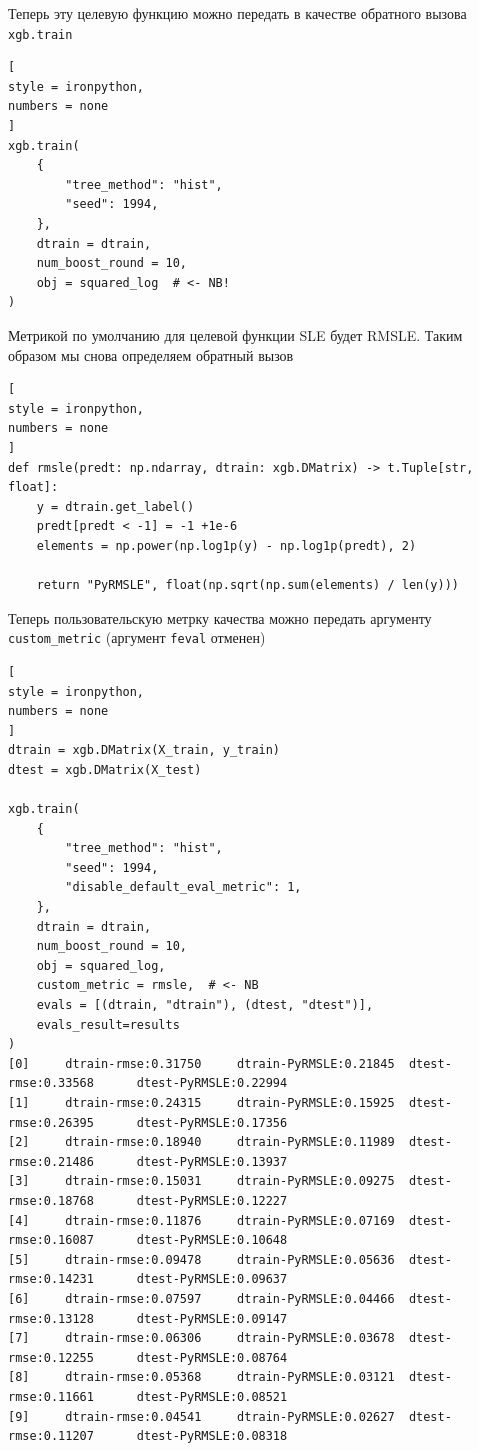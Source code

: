 \documentclass[%
	11pt,
	a4paper,
	utf8,
		]{article}
\begin{document}
Теперь эту целевую функцию можно передать в качестве обратного вызова \verb|xgb.train|
\begin{lstlisting}[
style = ironpython,
numbers = none
]
xgb.train(
    {
        "tree_method": "hist",
        "seed": 1994,
    },
    dtrain = dtrain,
    num_boost_round = 10,
    obj = squared_log  # <- NB!
)
\end{lstlisting}

Метрикой по умолчанию для целевой функции SLE будет RMSLE. Таким образом мы снова определяем обратный вызов
\begin{lstlisting}[
style = ironpython,
numbers = none
]
def rmsle(predt: np.ndarray, dtrain: xgb.DMatrix) -> t.Tuple[str, float]:
    y = dtrain.get_label()
    predt[predt < -1] = -1 +1e-6
    elements = np.power(np.log1p(y) - np.log1p(predt), 2)
    
    return "PyRMSLE", float(np.sqrt(np.sum(elements) / len(y)))
\end{lstlisting}

Теперь пользовательскую метрку качества можно передать аргументу \verb|custom_metric| (аргумент \verb|feval| отменен)
\begin{lstlisting}[
style = ironpython,
numbers = none
]
dtrain = xgb.DMatrix(X_train, y_train)
dtest = xgb.DMatrix(X_test)

xgb.train(
    {
        "tree_method": "hist",
        "seed": 1994,
        "disable_default_eval_metric": 1,
    },
    dtrain = dtrain,
    num_boost_round = 10,
    obj = squared_log,
    custom_metric = rmsle,  # <- NB
    evals = [(dtrain, "dtrain"), (dtest, "dtest")],
    evals_result=results
)
[0]     dtrain-rmse:0.31750     dtrain-PyRMSLE:0.21845  dtest-rmse:0.33568      dtest-PyRMSLE:0.22994
[1]     dtrain-rmse:0.24315     dtrain-PyRMSLE:0.15925  dtest-rmse:0.26395      dtest-PyRMSLE:0.17356
[2]     dtrain-rmse:0.18940     dtrain-PyRMSLE:0.11989  dtest-rmse:0.21486      dtest-PyRMSLE:0.13937
[3]     dtrain-rmse:0.15031     dtrain-PyRMSLE:0.09275  dtest-rmse:0.18768      dtest-PyRMSLE:0.12227
[4]     dtrain-rmse:0.11876     dtrain-PyRMSLE:0.07169  dtest-rmse:0.16087      dtest-PyRMSLE:0.10648
[5]     dtrain-rmse:0.09478     dtrain-PyRMSLE:0.05636  dtest-rmse:0.14231      dtest-PyRMSLE:0.09637
[6]     dtrain-rmse:0.07597     dtrain-PyRMSLE:0.04466  dtest-rmse:0.13128      dtest-PyRMSLE:0.09147
[7]     dtrain-rmse:0.06306     dtrain-PyRMSLE:0.03678  dtest-rmse:0.12255      dtest-PyRMSLE:0.08764
[8]     dtrain-rmse:0.05368     dtrain-PyRMSLE:0.03121  dtest-rmse:0.11661      dtest-PyRMSLE:0.08521
[9]     dtrain-rmse:0.04541     dtrain-PyRMSLE:0.02627  dtest-rmse:0.11207      dtest-PyRMSLE:0.08318
\end{lstlisting}
\end{document}
